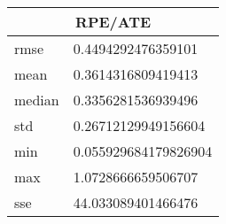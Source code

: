 \begin{table}[!ht] 
 \centering 
 \begin{tabular}{|l|l|} \hline 
 \multicolumn{2}{|c|}{RPE/ATE} \\ \hline 
 rmse & 0.4494292476359101 \\ \hline 
mean & 0.3614316809419413 \\ \hline 
median & 0.3356281536939496 \\ \hline 
std & 0.26712129949156604 \\ \hline 
min & 0.055929684179826904 \\ \hline 
max & 1.0728666659506707 \\ \hline 
sse & 44.033089401466476 \\ \hline 
\end{tabular} 
 \end{table}